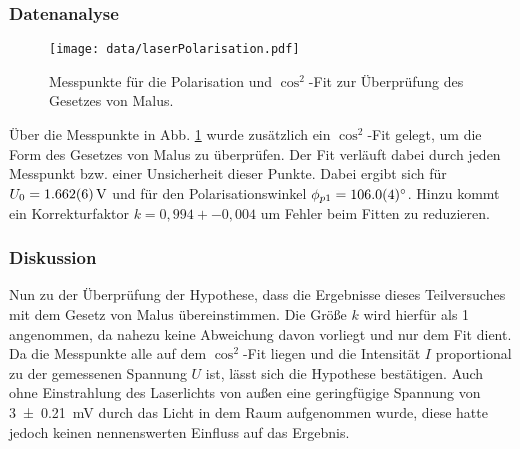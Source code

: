 		\subsubsection*{Datenanalyse}
			
			\begin{figure}[ht]
				\centering
				\texttt{[image: data/laserPolarisation.pdf]}
				\caption{Messpunkte für die Polarisation und $\cos^2$-Fit zur Überprüfung des Gesetzes von Malus.}
				\label{fig:PolarisationFit}	
			\end{figure}
			Über die Messpunkte in Abb. \ref{fig:PolarisationFit} wurde zusätzlich ein $\cos^2$-Fit gelegt, um die Form des Gesetzes von Malus zu überprüfen.
			Der Fit verläuft dabei durch jeden Messpunkt bzw. einer Unsicherheit dieser Punkte.
			Dabei ergibt sich für $U_0 = \SI{1,662+-0,006}{\volt}$ und für den Polarisationswinkel $\phi_{p1} = \SI{106+-0,4}{\degree}$.
			Hinzu kommt ein Korrekturfaktor $k=0,994+-0,004$ um Fehler beim Fitten zu reduzieren.
		
		\subsubsection*{Diskussion}
			
			Nun zu der Überprüfung der Hypothese, dass die Ergebnisse dieses Teilversuches mit dem Gesetz von Malus übereinstimmen.
			Die Größe $k$ wird hierfür als 1 angenommen, da nahezu keine Abweichung davon vorliegt und nur dem Fit dient.
			Da die Messpunkte alle auf dem $\cos^2$-Fit liegen und die Intensität $I$ proportional zu der gemessenen Spannung $U$ ist, lässt sich die Hypothese bestätigen.
			Auch ohne Einstrahlung des Laserlichts von außen eine geringfügige Spannung von \SI{3+-0,21}{\milli\volt} durch das Licht in dem Raum aufgenommen wurde, diese hatte jedoch keinen nennenswerten Einfluss auf das Ergebnis.
